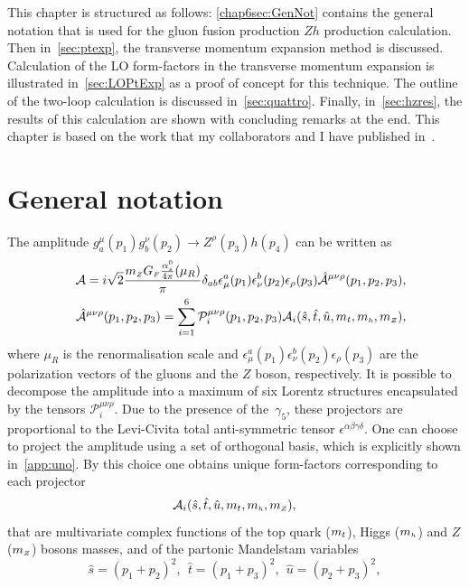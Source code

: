 \par This chapter is structured as follows: \autoref{chap6sec:GenNot} contains the general notation that is used for the gluon fusion production $Zh$ production calculation. Then in~\autoref{sec:ptexp}, the transverse momentum expansion method is discussed.  Calculation of the LO form-factors in the transverse momentum expansion is illustrated in~\autoref{sec:LOPtExp} as a proof of concept for this technique. The outline of the two-loop calculation is discussed in~\autoref{sec:quattro}. Finally, in~\autoref{sec:hzres}, the results of this calculation are shown with concluding remarks at the end.  This chapter is based on the work that my collaborators and I have published in~\cite{Alasfar:2021ppe}. 
\section{General notation \label{chap6sec:GenNot} }
\par The amplitude  $g^\mu_a(p_1)g^\nu_b(p_2)\to Z^\rho(p_3) h(p_4)$ can be written as
\begin{align}
	&&{\cal A}=i \sqrt{2}\frac{m_{ \scriptscriptstyle Z} G_{ \scriptscriptstyle F} \frac{\alpha_s^0}{4 \pi}(\mu_R)}{\pi}\delta_{ab}\epsilon^a_\mu(p_1)
	\epsilon^b_\nu(p_2)\epsilon_\rho(p_3)\hat{{\cal A}}^{\mu\nu\rho}(p_1,p_2,p_3 ),\\
	&&\hat{{\cal A}}^{\mu\nu\rho}(p_1,p_2,p_3 )=\sum_{i=1}^{6}
	\mathcal{P}_i^{\mu\nu\rho}(p_1,p_2,p_3 )
	{\cal A}_i(\hat{s},\hat{t},\hat{u},m_t,m_{ \scriptscriptstyle h},m_{ \scriptscriptstyle Z}),
	\label{eq:amp}
\end{align}
where  $\mu_R$ is the renormalisation scale and
$\epsilon^a_\mu(p_1)\epsilon^b_\nu(p_2)\epsilon_\rho(p_3)$ are the
polarization vectors of the gluons and the $Z$ boson, respectively.  It is possible to decompose the amplitude into a maximum of six Lorentz structures encapsulated by the 
tensors $\mathcal{P}_i^{\mu\nu\rho}$. Due to the presence of the~$\gamma_5$, these projectors are
proportional to the Levi-Civita total anti-symmetric tensor
$\epsilon^{\alpha\beta\gamma\delta}$. One can choose to project the amplitude using a set of orthogonal basis, which is explicitly shown in~\autoref{app:uno}. 
By this choice one obtains unique form-factors corresponding to each projector
\begin{equation}
	{\cal A}_i(\hat{s},\hat{t},\hat{u},m_t,m_{ \scriptscriptstyle h},m_{ \scriptscriptstyle Z}),
\end{equation}
that are multivariate complex functions of the
top quark ($m_t$), Higgs ($m_{ \scriptscriptstyle h}$) and $Z$ ($m_{ \scriptscriptstyle Z}$) bosons masses, and of the partonic Mandelstam variables
\begin{equation}
	\hat{s}=(p_1+p_2)^2,~~ \hat{t}=(p_1+p_3)^2,~~ \hat{u}=(p_2+p_3)^2,
\end{equation}
